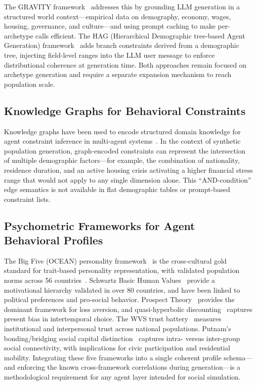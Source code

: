 \documentclass[a4paper,12pt]{article}
\begin{document}
The GRAVITY framework~\cite{gravity2025} addresses this by grounding LLM
generation in a structured world context---empirical data on demography,
economy, wages, housing, governance, and culture---and using prompt caching
to make per-archetype calls efficient. The HAG (Hierarchical Demographic
tree-based Agent Generation) framework~\cite{li2025hugagent} adds branch
constraints derived from a demographic tree, injecting field-level ranges
into the LLM user message to enforce distributional coherence at generation
time. Both approaches remain focused on archetype generation and require a
separate expansion mechanism to reach population scale.

\subsection{Knowledge Graphs for Behavioral Constraints}

Knowledge graphs have been used to encode structured domain knowledge for
agent constraint inference in multi-agent
systems~\cite{pan2023unifying,carrero2024integrating}. In the context of
synthetic population generation, graph-encoded constraints can represent the
intersection of multiple demographic factors---for example, the combination
of nationality, residence duration, and an active housing crisis activating
a higher financial stress range that would not apply to any single dimension
alone. This ``AND-condition'' edge semantics is not available in flat
demographic tables or prompt-based constraint lists.

\subsection{Psychometric Frameworks for Agent Behavioral Profiles}

The Big Five (OCEAN) personality framework~\cite{costa1992neopersonality}
is the cross-cultural gold standard for trait-based personality representation,
with validated population norms across 56 countries~\cite{schmitt2007geographic}.
Schwartz Basic Human Values~\cite{schwartz1992universals} provide a motivational
hierarchy validated in over 80 countries, and have been linked to political
preferences and pro-social behavior. Prospect Theory~\cite{kahneman1979prospect}
provides the dominant framework for loss aversion, and quasi-hyperbolic
discounting~\cite{laibson1997golden} captures present bias in intertemporal
choice. The WVS trust battery~\cite{inglehart2020worldvalues} measures
institutional and interpersonal trust across national populations. Putnam's
bonding/bridging social capital distinction~\cite{putnam2000bowling} captures
intra- versus inter-group social connectivity, with implications for civic
participation and residential mobility. Integrating these five frameworks into
a single coherent profile schema---and enforcing the known cross-framework
correlations during generation---is a methodological requirement for any agent
layer intended for social simulation.
\end{document}
